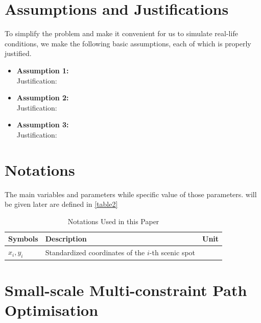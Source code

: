 \documentclass{mcmthesis} %
\begin{document}
\section{Assumptions and Justifications}

To simplify the problem and make it convenient for us to simulate real-life 
conditions, we make the following basic assumptions, each of which is properly 
justified.\\

\begin{itemize}
\item {\bf Assumption 1:}\\
Justification: \\
\item {\bf Assumption 2:}\\
Justification: \\
\item {\bf Assumption 3:}\\
Justification: \\
\end{itemize}
\section{Notations}
The main variables and parameters while specific value of those parameters.
will be given later are defined in \autoref{table2}\\
\begin{table}[H]
\centering
\caption{Notations Used in this Paper}
\label{table2}
\begin{tabularx}{\textwidth}{@{}>{\raggedright\arraybackslash}p{3.6cm} >{\raggedright\arraybackslash}X >{\centering\arraybackslash}p{1.2cm}@{}}
\toprule
\textbf{Symbols} & \textbf{Description} & \textbf{Unit} \\
\midrule

$x_i, y_i$ & Standardized coordinates of the $i$-th scenic spot & \text{--} \\

\bottomrule
\end{tabularx}
\end{table}

\section{Small-scale Multi-constraint Path Optimisation}
\end{document}
